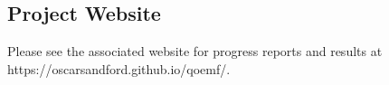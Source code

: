 \documentclass{article}
\begin{document}
\subsection{Project Website}
Please see the associated website for progress reports and results at https://oscarsandford.github.io/qoemf/.



\end{document}
